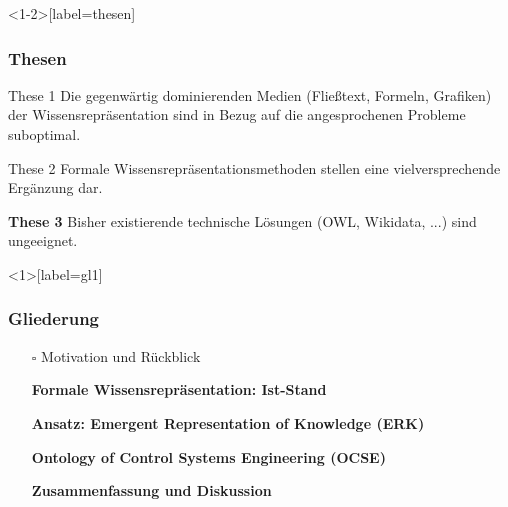 \documentclass[
	ngerman,
	10pt,				%
	aspectratio=169 	%
]{beamer}
\newcommand{\cdbox}{$\square$\hspace{-0.65em}\raisebox{0.1em}{\checkmark}\hspace{-0.18em}}
\begin{document}
\begin{frame}<1-2>[label=thesen]
  \frametitle{\large Thesen}
  
  
      \begin{block}{These 1}
        Die gegenwärtig dominierenden Medien (Fließtext, Formeln, Grafiken) der Wissensrepräsentation sind in Bezug auf die angesprochenen Probleme suboptimal.
    \end{block}
    
    \pause
    \bigskip
  
      \begin{block}{These 2}
        Formale Wissensrepräsentationsmethoden stellen eine vielversprechende Ergänzung dar.
    \end{block}
  
    \pause
    \bigskip
  
      \begin{block}{\textbf{These 3}}
        Bisher existierende technische Lösungen (OWL, Wikidata, ...) sind ungeeignet.
    \end{block}
    

\end{frame}





\begin{frame}<1>[label=gl1]
  \frametitle{Gliederung}
  \begin{itemize}
   \item[\cdbox] Motivation und Rückblick
   \item[\only<1>{$\rightarrow$}\only<2->{\cdbox}]
     \textbf<1>{Formale Wissensrepräsentation: Ist-Stand}
   \item[\only<1>{$\square$}\only<2>{$\rightarrow$}\only<3->{\cdbox}]
     \textbf<2>{Ansatz: Emergent Representation of Knowledge (ERK)}
   \item[\only<1-2>{$\square$}\only<3>{$\rightarrow$}\only<4->{\cdbox}]
     \textbf<3>{Ontology of Control Systems Engineering (OCSE)}
   \item[\only<1-3>{$\square$}\only<4>{$\rightarrow$}\only<5->{\cdbox}]
     \textbf<4>{Zusammenfassung und Diskussion}
  \end{itemize}
\end{frame}



\end{document}
